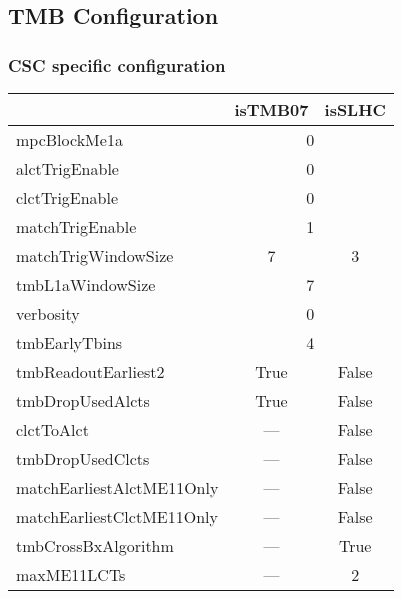 \newpage

\subsection{TMB Configuration}
\label{sec:TMB_conf}

\subsubsection{CSC specific configuration}

\begin{center}
	\begin{tabular}{|l|c|c|}
		\hline
		& isTMB07 & isSLHC \\
		\hline
		\hline
		mpcBlockMe1a & \multicolumn{2}{c|}{0} \\
		\hline
		alctTrigEnable & \multicolumn{2}{c|}{0} \\
                \hline
		clctTrigEnable & \multicolumn{2}{c|}{0} \\
                \hline
		matchTrigEnable & \multicolumn{2}{c|}{1} \\
                \hline
		matchTrigWindowSize & 7 & 3 \\
		\hline
		tmbL1aWindowSize & \multicolumn{2}{c|}{7} \\
                \hline
		verbosity & \multicolumn{2}{c|}{0} \\
                \hline
		tmbEarlyTbins & \multicolumn{2}{c|}{4} \\
                \hline
		tmbReadoutEarliest2  & True & False \\
		\hline
		tmbDropUsedAlcts & True & False \\
		\hline
		clctToAlct & --- & False \\
		\hline
		tmbDropUsedClcts & --- & False \\
		\hline
		matchEarliestAlctME11Only & --- & False \\
		\hline
		matchEarliestClctME11Only & --- & False \\
		\hline
		tmbCrossBxAlgorithm & --- & True \\
		\hline
		maxME11LCTs & --- & 2 \\
		\hline
	\end{tabular}
\end{center}

